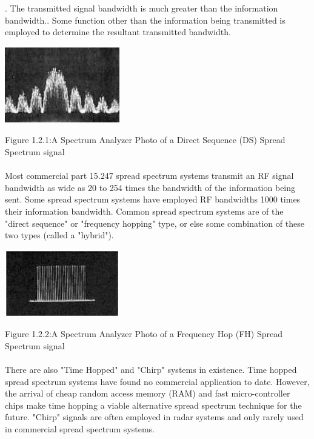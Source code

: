 \documentclass[a4paper]{report}
\begin{document}
\large\textnormal{\newline{}.	The transmitted signal bandwidth is much greater than the information bandwidth..	Some function other than the information being transmitted is employed to determine the resultant transmitted bandwidth.
}
\begin{center}
\includegraphics[width=5.0cm]{dsss.png}\\[0.75cm]
\end{center}
\begin{center}
\small\textnormal{Figure 1.2.1:A Spectrum Analyzer Photo of a Direct Sequence (DS) Spread Spectrum signal} 
\end{center}
\paragraph{}
\large\textnormal{Most commercial part 15.247 spread spectrum systems transmit an RF signal bandwidth as wide as 20 to 254 times the bandwidth of the information being sent. Some spread spectrum systems have employed RF bandwidths 1000 times their information bandwidth. Common spread spectrum systems are of the "direct sequence" or "frequency hopping" type, or else some combination of these two types (called a "hybrid").}
\begin{center}
\includegraphics[width=5.0cm]{fhss.png}\\[0.75cm]
\end{center}
\begin{center}
\small\textnormal{Figure 1.2.2:A Spectrum Analyzer Photo of a Frequency Hop (FH) Spread Spectrum signal }
\end{center}
\paragraph{}
\large\textnormal{There are also "Time Hopped" and "Chirp" systems in existence. Time hopped spread spectrum systems have found no commercial application to date. However, the arrival of cheap random access memory (RAM) and fast micro-controller chips make time hopping a viable alternative spread spectrum technique for the future. "Chirp" signals are often employed in radar systems and only rarely used in commercial spread spectrum systems.}
\end{document}
